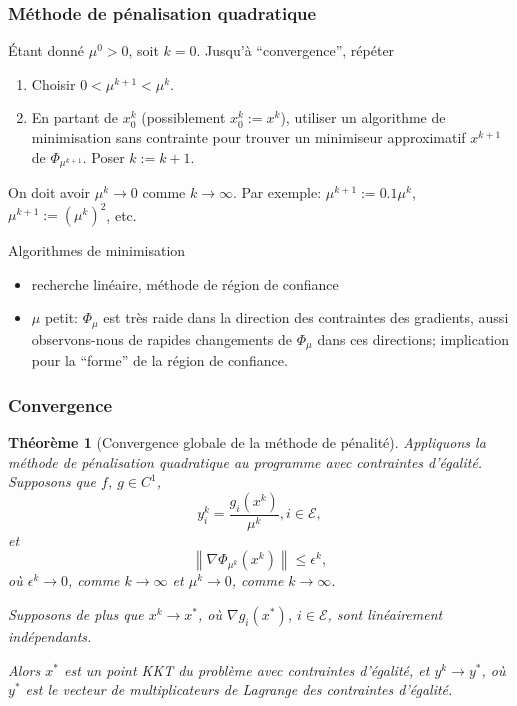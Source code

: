 \documentclass[t,usepdftitle=false,aspectratio=169]{beamer}
\newtheorem{thm}{Théorème}
\def\cE{\mathcal{E}}
\begin{document}
\begin{frame}
\frametitle{Méthode de pénalisation quadratique}

Étant donné $\mu^0 > 0$, soit $k = 0$.
Jusqu'à ``convergence'', répéter
\begin{enumerate}
\item
Choisir $0 < \mu^{k+1} < \mu^k$.
\item
En partant de $x_0^k$ (possiblement $x_0^k := x^k$), utiliser un algorithme de minimisation sans contrainte pour trouver un minimiseur approximatif $x^{k+1}$ de $\Phi_{\mu^{k+1}}$.
Poser $k := k+1$.
\end{enumerate}

On doit avoir $\mu^k \rightarrow 0$ comme $k \rightarrow \infty$.
Par exemple: $\mu^{k+1} := 0.1\mu^k$, $\mu^{k+1} := (\mu^k)^2$, etc.

\mbox{}

Algorithmes de minimisation
\begin{itemize}
\item
recherche linéaire, méthode de région de confiance
\item
$\mu$ petit: $\Phi_{\mu}$ est très raide dans la direction des contraintes des gradients, aussi observons-nous de rapides changements de $\Phi_{\mu}$ dans ces directions; implication pour la ``forme'' de la région de confiance.
\end{itemize}

\end{frame}

\begin{frame}
\frametitle{Convergence}

\begin{thm}[Convergence globale de la méthode de pénalité]
Appliquons la méthode de pénalisation quadratique au programme avec contraintes d'égalité.
Supposons que $f$, $g \in C^1$,
$$
y_i^k = \frac{g_i(x^k)}{\mu^k}, i \in \cE,
$$
et
$$
\left\| \nabla \Phi_{\mu^k}(x^k) \right\| \leq \epsilon^k,
$$
où $\epsilon^k \rightarrow 0$, comme $k \rightarrow \infty$
et $\mu^k \rightarrow 0$, comme $k \rightarrow \infty$.

Supposons de plus que $x^k \rightarrow x^*$, où $\nabla g_i(x^*)$, $i \in \cE$, sont linéairement indépendants.

Alors $x^*$ est un point KKT du problème avec contraintes d'égalité, et $y^k \rightarrow y^*$, où $y^*$ est le vecteur de multiplicateurs de Lagrange des contraintes d'égalité.
\end{thm}

\end{frame}
\end{document}
